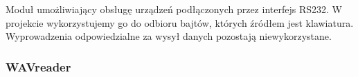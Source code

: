 \documentclass{article}
\begin{document}
\begin{figure}[H]
    \centering
\end{figure}

Moduł umożliwiający obsługę urządzeń podłączonych przez interfejs RS232. W projekcie wykorzystujemy go do odbioru bajtów, których źródłem jest klawiatura. Wyprowadzenia odpowiedzialne za wysył danych pozostają niewykorzystane.

\subsubsection{WAVreader}
\end{document}
